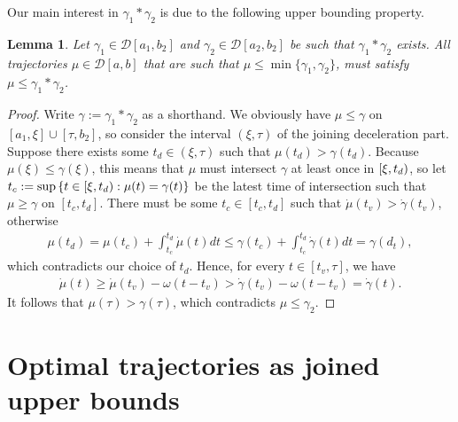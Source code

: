 \documentclass[a4paper]{article}
\theoremstyle{definition}
\theoremstyle{plain}
\newtheorem{lemma}{Lemma\hspace{0.25em}\ignorespaces}
\begin{document}
Our main interest in $\gamma_{1} * \gamma_{2}$ is due to the following upper bounding
property.

\begin{lemma}\label{lemma:upperbound}
  Let $\gamma_{1} \in \mathcal{D}[a_{1}, b_{2}]$ and
  $\gamma_{2} \in \mathcal{D}[a_{2}, b_{2}]$ be such that $\gamma_{1} * \gamma_{2}$ exists. All
  trajectories $\mu \in \mathcal{D}[a, b]$ that are such that
  $\mu \leq \min\{\gamma_{1}, \gamma_{2}\}$, must satisfy $\mu \leq \gamma_{1} * \gamma_{2}$.
\end{lemma}
\begin{proof}
  Write $\gamma := \gamma_{1} * \gamma_{2}$ as a shorthand. We obviously have
  $\mu \leq \gamma$ on $[a_{1}, \xi] \cup [\tau, b_{2}]$, so consider the interval $(\xi, \tau)$ of the joining
  deceleration part. Suppose there exists some $t_{d} \in (\xi, \tau)$ such that
  $\mu(t_{d}) > \gamma(t_{d})$. Because $\mu(\xi) \leq \gamma(\xi)$, this means that $\mu$ must
  intersect $\gamma$ at least once in $[\xi,t_{d})$, so let
  $t_{c} := \sup \, \{ t \in [\xi,t_{d}) : \mu(t) = \gamma(t) \}$ be the latest
  time of intersection such that $\mu \geq \gamma$ on $[t_{c}, t_{d}]$. There must be
  some $t_{c} \in [t_{c}, t_{d}]$ such that $\dot{\mu}(t_{v}) > \dot{\gamma}(t_{v})$, otherwise
  \begin{align*}
    \mu(t_{d}) = \mu(t_{c}) + \int_{t_{c}}^{t_{d}} \dot{\mu}(t) dt \leq \gamma(t_{c}) + \int_{t_{c}}^{t_{d}} \dot{\gamma}(t) dt = \gamma(d_{t}) ,
  \end{align*}
  which contradicts our choice of $t_{d}$. Hence, for every
  $t \in [t_{v}, \tau]$, we have
  \begin{align*}
    \dot{\mu}(t) \geq \dot{\mu}(t_{v}) - \omega (t - t_{v}) > \dot{\gamma}(t_{v}) - \omega(t - t_{v}) = \dot{\gamma}(t) .
  \end{align*}
  It follows that $\mu(\tau) > \gamma(\tau)$, which contradicts
  $\mu \leq \gamma_{2}$.
\end{proof}

\section{Optimal trajectories as joined upper bounds}
\end{document}
